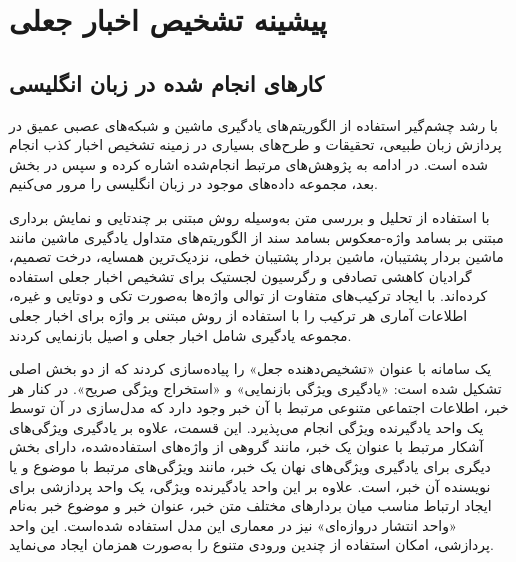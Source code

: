 \chapter{پیشینه تشخیص اخبار جعلی}
\section{کارهای انجام شده در زبان انگلیسی}
با رشد چشم‌گیر استفاده از الگوریتم‌های یادگیری ماشین و شبکه‌های عصبی عمیق در پردازش زبان طبیعی، تحقیقات و طرح‌های بسیاری در زمینه تشخیص اخبار کذب انجام شده ‌است. در ادامه به پژوهش‌های مرتبط انجام‌شده اشاره کرده و سپس در بخش بعد، مجموعه داده‌های موجود در زبان انگلیسی را مرور می‌کنیم.

\citet{ahmed2017detection} با استفاده از تحلیل و بررسی متن به‌وسیله روش مبتنی ‌بر چندتایی و نمایش برداری مبتنی‌ بر بسامد واژه-معکوس بسامد سند از الگوریتم‌های متداول یادگیری ماشین مانند ماشین بردار پشتیبان، ماشین بردار پشتیبان خطی، نزدیک‌ترین همسایه، درخت تصمیم، گرادیان کاهشی تصادفی و رگرسیون لجستیک برای تشخیص اخبار جعلی استفاده کرده‌اند. با ایجاد ترکیب‌های متفاوت از توالی واژه‌ها به‌صورت تکی و دوتایی و غیره، اطلاعات آماری هر ترکیب را با استفاده از روش مبتنی‌ بر واژه برای اخبار جعلی مجموعه یادگیری شامل اخبار جعلی و اصیل بازنمایی کردند. %

\citet{zhang2020fakedetector} یک سامانه با عنوان «تشخیص‌دهنده جعل» را پیاده‌سازی  کردند که از دو بخش اصلی تشکیل شده ‌است: «یادگیری ویژگی بازنمایی»   و «استخراج ویژگی صریح». در کنار هر خبر، اطلاعات اجتماعی متنوعی مرتبط با آن خبر وجود دارد که مدل‌سازی در آن توسط یک واحد یادگیرنده ویژگی انجام می‌پذیرد. این قسمت، علاوه بر یادگیری ویژگی‌های آشکار مرتبط با  عنوان یک خبر، مانند گروهی از واژه‌های استفاده‌شده، دارای بخش دیگری برای یادگیری ویژگی‌های نهان یک خبر، مانند ویژگی‌های مرتبط با موضوع و یا نویسنده آن خبر، است. علاوه بر این واحد یادگیرنده ویژگی، یک واحد پردازشی برای ایجاد ارتباط مناسب میان بردارهای مختلف متن خبر، عنوان خبر و موضوع خبر به‌نام «واحد انتشار دروازه‌ای» نیز در معماری این مدل استفاده شده‌است. این واحد پردازشی، امکان استفاده از چندین ورودی متنوع را به‌صورت همزمان ایجاد می‌نماید.

